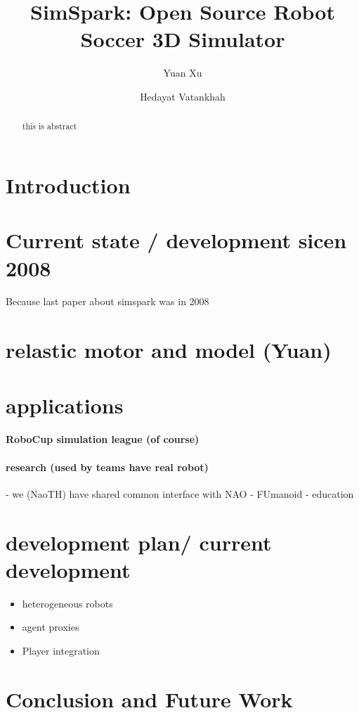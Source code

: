 \documentclass{llncs}
\begin{document}
\title{SimSpark: Open Source Robot Soccer 3D Simulator}

\author{Yuan Xu \and Hedayat Vatankhah}


\maketitle

\begin{abstract}
  this is abstract
\end{abstract}

\section{Introduction}

\cite{Boedecker2008,OR05}


\section{Current state / development sicen 2008}
Because last paper about simspark was in 2008

\section{relastic motor and model (Yuan)}

\section{applications}

\paragraph{RoboCup simulation league (of course)}

\paragraph{research (used by teams have real robot)}
- we (NaoTH) have shared common interface with NAO
- FUmanoid
- education

\section{development plan/ current development}
\begin{itemize}
\item heterogeneous robots
\item agent proxies
\item Player integration
\end{itemize}

\section{Conclusion and Future Work}



\end{document}
